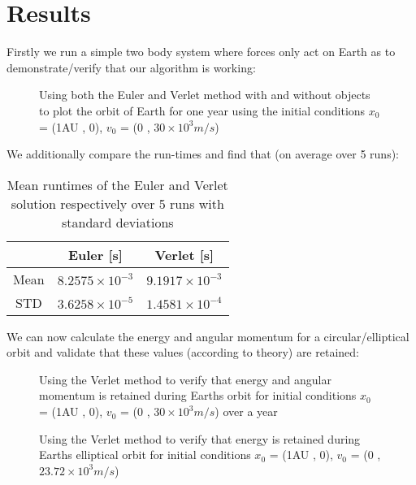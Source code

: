 \documentclass{article}
\begin{document}
\section{Results}
Firstly we run a simple two body system where forces only act on Earth as to demonstrate/verify that our algorithm is working:
\begin{figure}[ht!] \label{fig1}
\centering
{}
\caption{Using both the Euler and Verlet method with and without objects to plot the orbit of Earth for one year using the initial conditions $x_0$ = (1AU , 0), $v_0$ = (0 , $30\times 10^3 m/s$)}
\end{figure} \newline
We additionally compare the run-times and find that (on average over 5 runs):
\begin{table}[ht!]
\centering
 \begin{tabular}{||c c c ||}
 \hline
 
  &  Euler [s] & Verlet [s] \\ [0.5ex] 
 \hline
 \hline
 Mean &  $8.2575\times 10^{-3}$ & $9.1917\times 10^{-3}$ \\ 
 \hline
 STD &  $3.6258\times 10^{-5}$ & $1.4581\times 10^{-4}$ \\
 \hline
 \hline
 
\end{tabular}
\caption{Mean runtimes of the Euler and Verlet solution respectively over 5 runs with standard deviations}
\label{tab1}
\end{table}\newpage
We can now calculate the energy and angular momentum for a circular/elliptical orbit and validate that these values (according to theory) are retained:
\begin{figure}[ht!] \label{fig2}
\centering
{}
\caption{Using the Verlet method to verify that energy and angular momentum is retained during Earths orbit for initial conditions $x_0$ = (1AU , 0), $v_0$ = (0 , $30\times 10^3 m/s$) over a year}
\end{figure}
\begin{figure}[ht!] \label{fig2}
\centering
{}
\caption{Using the Verlet method to verify that energy is retained during Earths elliptical orbit for initial conditions $x_0$ = (1AU , 0), $v_0$ = (0 , $23.72\times 10^3 m/s$)}
\end{figure} \newpage
\end{document}
